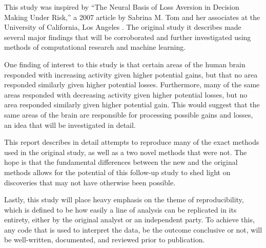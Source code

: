 
\par This study was inspired by ``The Neural Basis of Loss Aversion in Decision
Making Under Risk,'' a 2007 article by Sabrina M. Tom and her associates at the
University of California, Los Angeles \cite{tom2007neural}. The original study
it describes made several major findings that will be corroborated and further
investigated using methods of computational research and machine learning.

\par \indent One finding of interest to this study is that certain areas of the
human brain responded with increasing activity given higher potential gains, but
that no area responded similarly given higher potential losses. Furthermore,
many of the same areas responded with decreasing activity given higher potential
losses, but no area responded similarly given higher potential gain. This would
suggest that the same areas of the brain are responsible for processing possible
gains and losses, an idea that will be investigated in detail.

\par \indent This report describes in detail attempts to reproduce many of the
exact methods used in the original study, as well as a two novel methods that
were not. The hope is that the fundamental differences between the new and the
original methods allows for the potential of this follow-up study to shed light
on discoveries that may not have otherwise been possible.

\par \indent Lastly, this study will place heavy emphasis on the theme of
reproducibility, which is defined to be how easily a line of analysis can be
replicated in its entirety, either by the original analyst or an independent
party. To achieve this, any code that is used to interpret the data, be the
outcome conclusive or not, will be well-written, documented, and reviewed prior
to publication.